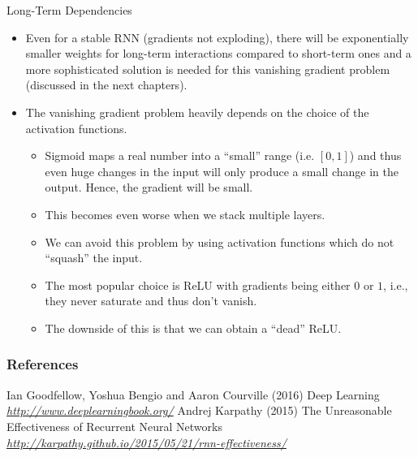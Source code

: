 \begin{vbframe}{Long-Term Dependencies}
  \begin{itemize}
    \item Even for a stable RNN (gradients not exploding), there will be exponentially smaller weights for long-term interactions compared to short-term ones and a more sophisticated solution is needed for this vanishing gradient problem (discussed in the next chapters).
    \item The {vanishing gradient problem} heavily depends on the choice of the activation functions.
    \begin{itemize} 
      \item Sigmoid maps a real number into a \enquote{small} range (i.e. $[0, 1]$) and thus even huge changes in the input will only produce a small change in the output. Hence, the gradient will be small.
      \item This becomes even worse when we stack multiple layers.
      \item We can avoid this problem by using activation functions which do not \enquote{squash} the input.
      \item The most popular choice is ReLU with gradients being either $0$ or $1$, i.e., they never saturate and thus don't vanish.
      \item The downside of this is that we can obtain a \enquote{dead} ReLU.
    \end{itemize}

  \end{itemize}


\end{vbframe}
\begin{vbframe}
\frametitle{References}
\footnotesize{
\begin{thebibliography}{99}
 Ian Goodfellow, Yoshua Bengio and Aaron Courville (2016)
\newblock Deep Learning
\newblock \emph{\url{http://www.deeplearningbook.org/}}
 Andrej Karpathy (2015)
\newblock The Unreasonable Effectiveness of Recurrent Neural Networks
\newblock \emph{\url{http://karpathy.github.io/2015/05/21/rnn-effectiveness/}}
\end{thebibliography}
}
\end{vbframe}

\endlecture
